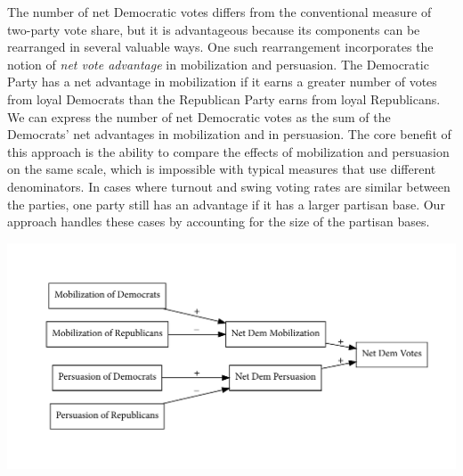 \documentclass[12pt
               ,final
               ]{article}
\begin{document}
The number of net Democratic votes differs from the conventional measure of two-party vote share, but it is advantageous because its components can be rearranged in several valuable ways. One such rearrangement incorporates the notion of \emph{net vote advantage} in mobilization and persuasion. The Democratic Party has a net advantage in mobilization if it earns a greater number of votes from loyal Democrats than the Republican Party earns from loyal Republicans. We can express the number of net Democratic votes as the sum of the Democrats' net advantages in mobilization and in persuasion. The core benefit of this approach is the ability to compare the effects of mobilization and persuasion on the same scale, which is impossible with typical measures that use different denominators. In cases where turnout and swing voting rates are similar between the parties, one party still has an advantage if it has a larger partisan base. Our approach handles these cases by accounting for the size of the partisan bases.
%

\begin{center}
  \includegraphics[width = \textwidth]{diagrams/net-vote-mechanisms.pdf}
\end{center}

\end{document}
